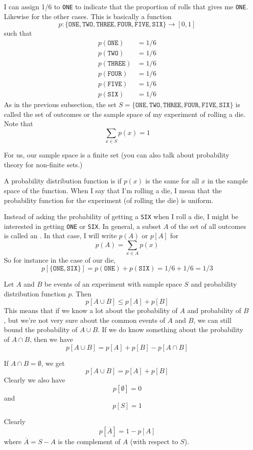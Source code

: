 I can assign 1/6 to \texttt{ONE} to indicate that the 
proportion of rolls that gives me \texttt{ONE}.
Likewise for the other cases.
This is basically a function
\[
p : \{\texttt{ONE},
\texttt{TWO},
\texttt{THREE},
\texttt{FOUR},
\texttt{FIVE},
\texttt{SIX}
\}
\rightarrow [0,1]
\]
such that 
\begin{align*}
p(\texttt{ONE}) &= 1/6 \\
p(\texttt{TWO}) &= 1/6 \\
p(\texttt{THREE}) &= 1/6 \\
p(\texttt{FOUR}) &= 1/6 \\
p(\texttt{FIVE}) &= 1/6 \\
p(\texttt{SIX}) &= 1/6
\end{align*}
As in the previous subsection, the set 
$S = \{
\texttt{ONE},
\texttt{TWO},
\texttt{THREE},
\texttt{FOUR},
\texttt{FIVE},
\texttt{SIX}
\}$ 
is called the set of outcomes or the sample space
of my experiment of rolling a die.
Note that
\[
\sum_{x \in S} p(x) = 1
\]

For us, our sample space is a finite set (you can also 
talk about probability theory for non-finite sets.) 





A probability distribution function is 
if $p(x)$ is the same for all $x$ in the sample space of the function.
When I say that I'm rolling a  die, I mean that the probability
function for the experiment (of rolling the die) is uniform.



Instead of asking the probability of getting a \texttt{SIX} when
I roll a die, I might be interested in getting \texttt{ONE} or \texttt{SIX}.
In general, a subset $A$ of the set of all outcomes is called an 
.
In that case, I will write $p(A)$ or $p[A]$ for
\[
p(A) = \sum_{x \in A} p(x)
\]
So for instance in the case of our die,
\[
p[\{\texttt{ONE}, \texttt{SIX}\}]
= p(\texttt{ONE}) + p(\texttt{SIX})
= 1/6 + 1/6 = 1/3
\]

Let $A$ and $B$ be events of an experiment with sample space $S$
and probability distribution function $p$.
Then
\[
p[A \cup B] \leq p[A] + p[B]
\]
This means that if we know a lot about the probability of $A$ and 
probability of $B$, but we're not very sure about the common
events of $A$ and $B$, we can still bound the probability of $A \cup B$.
If we do know something about the probability of $A \cap B$, then we have
\[
p[A \cup B] = p[A] + p[B] - p[A \cap B]
\]

If $A \cap B = \emptyset$, we get
\[
p[A \cup B] = p[A] + p[B]
\]
Clearly we also have
\[
p[\emptyset] = 0
\]
and
\[
p[S] = 1
\]

Clearly
\[
p[\overline{A}] = 1 - p[A]
\]
where $\overline{A} = S - A$ is the complement of $A$ (with respect to $S$).
